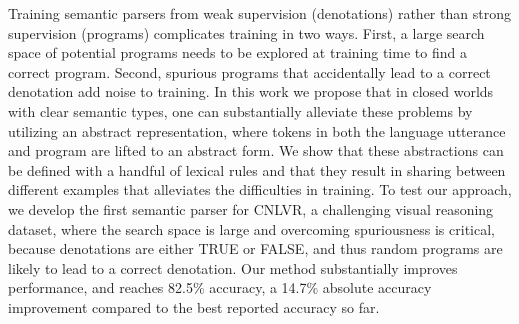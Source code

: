 Training semantic parsers from weak supervision (denotations) rather than strong supervision (programs) complicates training in two ways. First, a large search space of potential programs needs to be explored at training time to find a correct program. Second, spurious programs that accidentally lead to a correct denotation add noise to training. In this work we propose that in closed worlds with clear semantic types, one can substantially alleviate these problems by utilizing an abstract representation, where tokens in both the language utterance and program are lifted to an abstract form. We show that these abstractions can be defined with a handful of lexical rules and that they result in  sharing between different examples that alleviates the difficulties in training. To test our approach, we develop the first semantic parser for CNLVR, a challenging visual reasoning dataset, where the search space is large and overcoming spuriousness is critical, because denotations are either TRUE or FALSE, and thus random programs are likely to lead to a correct denotation. Our method substantially improves performance, and reaches 82.5\% accuracy, a 14.7\% absolute accuracy improvement compared to the best reported accuracy so far.
